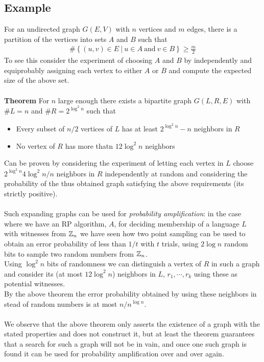 \subsection*{Example}
For an undirected graph $G\left( E,V \right)$ with $n$ vertices and $m$ edges,
there is a partition of the vertices into sets $A$ and $B$ such that
\begin{align*}
	\# \left\{ (u,v) \in E \ | \ u \in A \ \text{and} \ v \in B \right\} \geq \frac{m}{2}
\end{align*}
To see this consider the experiment of choosing $A$ and $B$ 
by independently and equiprobably assigning each vertex to either $A$ or $B$
and compute the expected size of the above set. \\ \\
\textbf{Theorem} \indent For $n$ large enough there exists a bipartite graph $G(L,R,E)$
with $\#L=n$ and $\#R = 2^{\log^2 n}$ such that
\begin{itemize}
	\item Every subset of $n/2$ vertices of $L$ has at least $2^{\log^2 n}-n$ neighbors in $R$
	\item No vertex of $R$ has more thatn $12 \log^2n$ neighbors
\end{itemize}
Can be proven by considering the experiment of letting each vertex in $L$ choose $2^{\log^2n}4 \log^2n/n$ neighbors in $R$
independently at random and considering the probability of the thus obtained graph satisfying the above requirements 
(its strictly positive). \\ \\
Such expanding graphs can be used for \textit{probability amplification}:
in the case where we have an RP algorithm, $A$, for deciding membership of a language $L$
with witnesses from $\mathbb{Z}_n$ we have seen how two point sampling can be used to obtain an error probability of
less than $1/t$ with $t$ trials, using $2 \log n$ random bits to sample two random numbers from $\mathbb{Z}_n$. \\
Using $\log^2n$ bits of randomness we can distinguish a vertex of $R$ in such a graph
and consider its (at most $12 \log^2n$) neighbors in $L$, $r_1,\cdots,r_k$
using these as potential witnesses. \\
By the above theorem the error probability obtained by using these neighbors in stead of random numbers is at most
$n/n^{\log n}$. \\ \\
We observe that the above theorem only asserts the existence of a graph with the stated properties
and does not construct it, but at least the theorem guarantees that a search for such a graph will not be in vain,
and once one such graph is found it can be used for probability amplification over and over again.
\newpage
